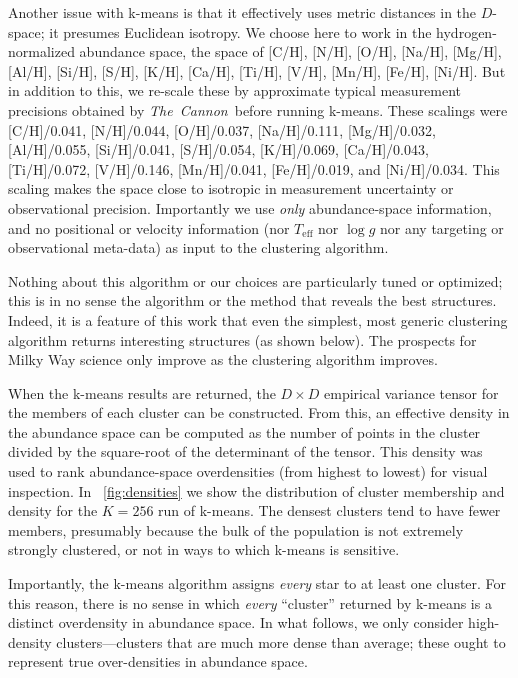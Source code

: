 \documentclass[12pt, letterpaper, preprint]{aastex}
\newcommand{\project}[1]{\textsl{#1}}
\newcommand{\thecannon}{\project{The~Cannon}}
\newcommand{\teff}{T_{\mathrm{eff}}}
\newcommand{\logg}{\log g}
\begin{document}
Another issue with k-means is that it effectively uses metric
distances in the $D$-space; it presumes Euclidean isotropy.
We choose here to work in the hydrogen-normalized abundance space, the
space of [C/H], [N/H], [O/H], [Na/H], [Mg/H], [Al/H], [Si/H], [S/H],
[K/H], [Ca/H], [Ti/H], [V/H], [Mn/H], [Fe/H], [Ni/H].
But in addition to this, we re-scale these by approximate typical measurement
precisions obtained by \thecannon\ before running k-means.
These scalings were
  [C/H]/0.041,
  [N/H]/0.044,
  [O/H]/0.037,
  [Na/H]/0.111,
  [Mg/H]/0.032,
  [Al/H]/0.055,
  [Si/H]/0.041,
  [S/H]/0.054,
  [K/H]/0.069,
  [Ca/H]/0.043,
  [Ti/H]/0.072,
  [V/H]/0.146,
  [Mn/H]/0.041,
  [Fe/H]/0.019, and
  [Ni/H]/0.034.
This scaling makes the space close to isotropic in measurement uncertainty or
observational precision.
Importantly we use \emph{only} abundance-space information, and no
positional or velocity information (nor $\teff$ nor $\logg$ nor any
targeting or observational meta-data) as input to the clustering
algorithm.

Nothing about this algorithm or our choices are particularly
tuned or optimized; this is in no sense the
algorithm or the method that reveals the best structures.
Indeed, it is a feature of this work that even the simplest, most
generic clustering algorithm returns interesting
structures (as shown below).
The prospects for Milky Way science only improve as the clustering
algorithm improves.

When the k-means results are returned, the $D\times D$ empirical
variance tensor for the members of each cluster can be constructed.
From this, an effective density in the abundance space can be computed
as the number of points in the cluster divided by the square-root of
the determinant of the tensor.
This density was used to rank abundance-space overdensities (from highest
to lowest) for visual inspection.
In \figurename~\ref{fig:densities} we show the distribution of cluster membership
and density for the $K=256$ run of k-means.
The densest clusters tend to have fewer members, presumably because
the bulk of the population is not extremely strongly clustered, or not
in ways to which k-means is sensitive.

Importantly, the k-means algorithm assigns \emph{every} star to at
least one cluster.
For this reason, there is no sense in which \emph{every} ``cluster'' returned
by k-means is a distinct overdensity in abundance space.
In what follows, we only consider high-density clusters---clusters
that are much more dense than average; these ought to represent true
over-densities in abundance space.
\end{document}
